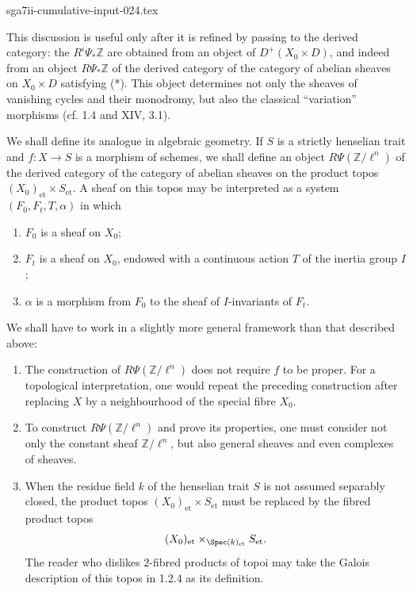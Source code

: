 \begin{filecontents*}{sga7ii-cumulative-input-024.tex}

This discussion is useful only after it is refined by passing to the
derived category: the $R^i\Psi_*\mathbb Z$ are obtained from an object
of $D^+(X_0\times D)$, and indeed from an object
$R\Psi_*\mathbb Z$ of the derived category of the category of abelian
sheaves on $X_0\times D$ satisfying (*).  This object determines not
only the sheaves of vanishing cycles and their monodromy, but also the
classical ``variation'' morphisms (cf. 1.4 and XIV, 3.1).

We shall define its analogue in algebraic geometry.  If $S$ is a
strictly henselian trait and $f:X\longrightarrow S$ is a morphism of
schemes, we shall define an object $R\Psi(\mathbb Z/\ell^n)$ of the
derived category of the category of abelian sheaves on the product
topos $(X_0)_{\mathrm{et}}\times S_{\mathrm{et}}$.  A sheaf on this
topos may be interpreted as a system $(F_0,F_t,T,\alpha)$ in which
\begin{enumerate}[label=\alph*),leftmargin=2.5em]
\item[$\alpha$)] $F_0$ is a sheaf on $X_0$;
\item[$\beta$)] $F_t$ is a sheaf on $X_0$, endowed with a continuous action $T$
of the inertia group $I$;
\item[$\gamma$)] $\alpha$ is a morphism from $F_0$ to the sheaf of $I$-invariants
of $F_t$.
\end{enumerate}

We shall have to work in a slightly more general framework than that
described above:
\begin{enumerate}[label=\alph*),leftmargin=2.5em]
\item The construction of $R\Psi(\mathbb Z/\ell^n)$ does not require
$f$ to be proper.  For a topological interpretation, one would repeat
the preceding construction after replacing $X$ by a neighbourhood of
the special fibre $X_0$.

\item To construct $R\Psi(\mathbb Z/\ell^n)$ and prove its properties,
one must consider not only the constant sheaf $\mathbb Z/\ell^n$, but
also general sheaves and even complexes of sheaves.

\item When the residue field $k$ of the henselian trait $S$ is not
assumed separably closed, the product topos
$(X_0)_{\mathrm{et}}\times S_{\mathrm{et}}$ must be replaced by the
fibred product topos
\begin{equation*}
(X_0)_{\mathrm{et}}
\times_{\Spec(k)_{\mathrm{et}}}S_{\mathrm{et}}.
\end{equation*}
The reader who dislikes $2$-fibred products of topoi may take the Galois
description of this topos in 1.2.4 as its definition.
\end{enumerate}


\end{filecontents*}
